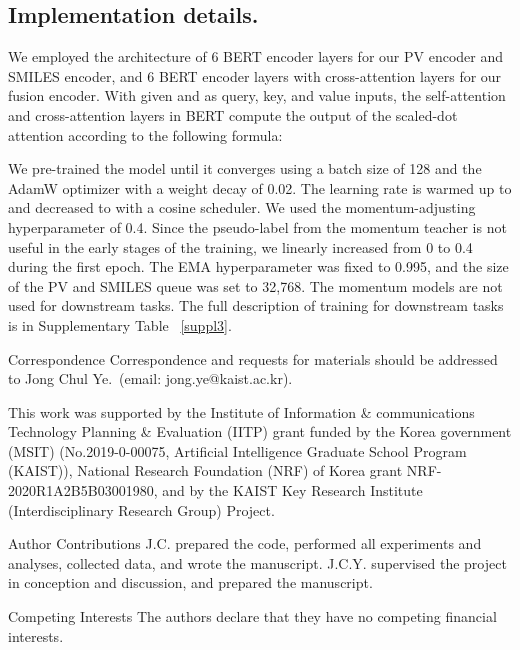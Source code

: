 \documentclass{nature_meth}
\newcommand{\1}{\blmath{1}}
\newcommand{\0}{\blmath{0}}
\begin{document}
\subsection{Implementation details.}
We employed the architecture of 6 BERT encoder layers for our PV encoder and SMILES encoder, and 6 BERT encoder layers with cross-attention layers for our fusion encoder. With given  and  as query, key, and value inputs, the self-attention and cross-attention layers in BERT compute the output of the scaled-dot attention according to the following formula:


We pre-trained the model until it converges using a batch size of 128 and the AdamW optimizer with a weight decay of 0.02. The learning rate is warmed up to  and decreased to  with a cosine scheduler. We used the momentum-adjusting hyperparameter  of 0.4. Since the pseudo-label from the momentum teacher is not useful in the early stages of the training, we linearly increased  from 0 to 0.4 during the first epoch. The EMA hyperparameter  was fixed to 0.995, and the size of the PV and SMILES queue  was set to 32,768. The momentum models are not used for downstream tasks. The full description of training for downstream tasks is in Supplementary Table ~\ref{suppl3}.


 \begin{addendum}
{\color{black} \item[Correspondence] Correspondence and requests for materials should be addressed to Jong Chul Ye.~(email: jong.ye@kaist.ac.kr).}
 \item  This work was supported by the Institute of Information \& communications Technology Planning \& Evaluation (IITP) grant funded by the Korea government (MSIT)  (No.2019-0-00075, Artificial Intelligence Graduate School Program (KAIST)), National Research Foundation (NRF) of Korea grant NRF-2020R1A2B5B03001980, and by the KAIST Key Research Institute (Interdisciplinary Research Group) Project.
{
\item[Author Contributions] J.C. prepared the code, performed all experiments and analyses, collected data, and wrote the manuscript. J.C.Y. supervised the project in conception and discussion, and prepared the manuscript.}
 \item[Competing Interests] 
The authors declare that they have no competing financial interests.

\end{addendum}
\end{document}
